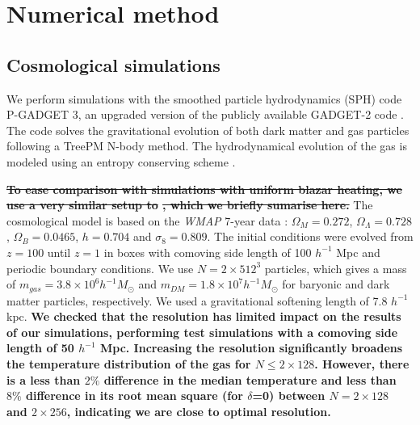 \documentclass[twocolumns]{emulateapj}
\newcommand\ALc[1]{{\color{red} \bf #1}} %
\begin{document}


 


\section{Numerical method}
\subsection{Cosmological simulations}
We perform simulations with the smoothed particle hydrodynamics (SPH)  code \textsc{P-GADGET 3}, an upgraded version of the publicly available \textsc{GADGET-2} code \citep{2005MNRAS.364.1105S}. The code solves the gravitational evolution of both dark matter and gas particles following a TreePM N-body method. The hydrodynamical evolution of the gas is modeled using an entropy conserving scheme \citep{2002MNRAS.333..649S}.

\ALc{\sout{To ease comparison with simulations with uniform blazar heating, we use a very similar setup to }\citet{2012MNRAS.423..149P}\sout{, which we briefly sumarise here. }}
The cosmological model is based on the \textit{WMAP} 7-year data \citep{2011ApJS..192...18K}: $\Omega_M=0.272$, $\Omega_{\Lambda}=0.728$, $\Omega_{B}= 0.0465$, $h=0.704$ and $\sigma_8=0.809$. The initial conditions were evolved from $z=100$ until $z=1$ in boxes with  comoving side length of 100 $h^{-1}$ Mpc and periodic boundary conditions. We use $N= 2\times 512^3$ particles, which gives a mass of $m_{gas}=3.8\times10^{6} h^{-1} M_{\odot}$ and $m_{DM}=1.8\times 10^{7} h^{-1} M_{\odot}$ for baryonic and dark matter particles, respectively. We used  a gravitational softening length of 7.8 $h^{-1}$ kpc.  \ALc{We checked that the resolution has limited impact on the results of our simulations, performing test simulations with a comoving side length of  50 $h^{-1}$ Mpc.  Increasing the resolution significantly broadens  the temperature distribution of the gas for $N\leqslant 2\times 128$. However, there is a less than $2\%$ difference in the median temperature and less than $8\%$ difference in its root mean square (for $\delta$=0) between $N=2\times 128$ and $2\times 256$, indicating we are close to optimal resolution. }
\end{document}
